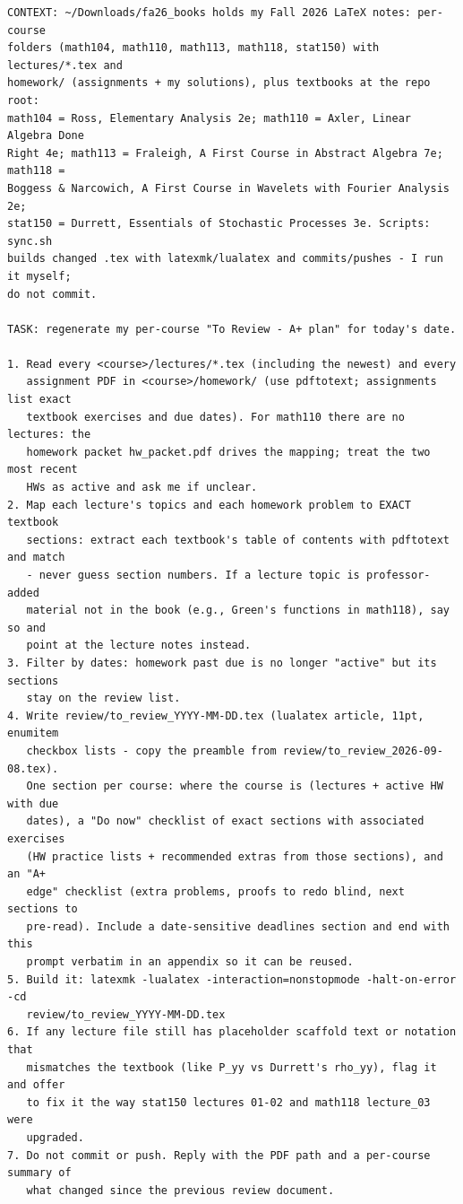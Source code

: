 \documentclass[11pt]{article}
\begin{document}
\begin{verbatim}
CONTEXT: ~/Downloads/fa26_books holds my Fall 2026 LaTeX notes: per-course
folders (math104, math110, math113, math118, stat150) with lectures/*.tex and
homework/ (assignments + my solutions), plus textbooks at the repo root:
math104 = Ross, Elementary Analysis 2e; math110 = Axler, Linear Algebra Done
Right 4e; math113 = Fraleigh, A First Course in Abstract Algebra 7e; math118 =
Boggess & Narcowich, A First Course in Wavelets with Fourier Analysis 2e;
stat150 = Durrett, Essentials of Stochastic Processes 3e. Scripts: sync.sh
builds changed .tex with latexmk/lualatex and commits/pushes - I run it myself;
do not commit.

TASK: regenerate my per-course "To Review - A+ plan" for today's date.

1. Read every <course>/lectures/*.tex (including the newest) and every
   assignment PDF in <course>/homework/ (use pdftotext; assignments list exact
   textbook exercises and due dates). For math110 there are no lectures: the
   homework packet hw_packet.pdf drives the mapping; treat the two most recent
   HWs as active and ask me if unclear.
2. Map each lecture's topics and each homework problem to EXACT textbook
   sections: extract each textbook's table of contents with pdftotext and match
   - never guess section numbers. If a lecture topic is professor-added
   material not in the book (e.g., Green's functions in math118), say so and
   point at the lecture notes instead.
3. Filter by dates: homework past due is no longer "active" but its sections
   stay on the review list.
4. Write review/to_review_YYYY-MM-DD.tex (lualatex article, 11pt, enumitem
   checkbox lists - copy the preamble from review/to_review_2026-09-08.tex).
   One section per course: where the course is (lectures + active HW with due
   dates), a "Do now" checklist of exact sections with associated exercises
   (HW practice lists + recommended extras from those sections), and an "A+
   edge" checklist (extra problems, proofs to redo blind, next sections to
   pre-read). Include a date-sensitive deadlines section and end with this
   prompt verbatim in an appendix so it can be reused.
5. Build it: latexmk -lualatex -interaction=nonstopmode -halt-on-error -cd
   review/to_review_YYYY-MM-DD.tex
6. If any lecture file still has placeholder scaffold text or notation that
   mismatches the textbook (like P_yy vs Durrett's rho_yy), flag it and offer
   to fix it the way stat150 lectures 01-02 and math118 lecture_03 were
   upgraded.
7. Do not commit or push. Reply with the PDF path and a per-course summary of
   what changed since the previous review document.
\end{verbatim}
\end{document}
